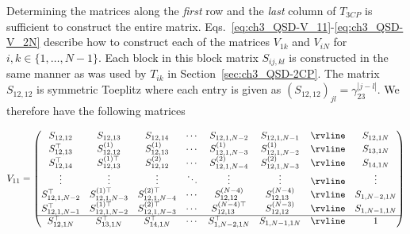 \begin{appendices}
Determining the matrices along the \emph{first} row and the \emph{last} column of $T_{3CP}$ is sufficient to construct the entire matrix.
Eqs.~\eqref{eq:ch3_QSD-V_11}-\eqref{eq:ch3_QSD-V_2N} describe how to construct each of the matrices $V_{1k}$ and $V_{iN}$ for $i, k \in \{1, \dots, N-1\}$.
Each block in this block matrix $S_{ij,kl}$ is constructed in the same manner as was used by $T_{ik}$ in Section~\ref{sec:ch3_QSD-2CP}.
The matrix $S_{12,12}$ is symmetric Toeplitz where each entry is given as $(S_{12,12})_{jl} = \gamma_{23}^{|j-l|}$.
We therefore have the following matrices

\begin{align}
    \label{eq:ch3_QSD-V_11}
    V_{11} =
    \begin{pmatrix}
        S_{12,12} & S_{12,13} & S_{12,14} & \cdots & S_{12,1,N-2} & S_{12,1,N-1} & \rvline & S_{12,1N} \\
        S_{12,13}^\top & S_{12,12}^{(1)} & S_{12,13}^{(1)} & \cdots & S_{12,1,N-3}^{(1)} & S_{12,1,N-2}^{(1)} & \rvline & S_{13,1N} \\
        S_{12,14}^\top & S_{12,13}^{(1)\top} & S_{12,12}^{(2)} & \cdots & S_{12,1,N-4}^{(2)} & S_{12,1,N-3}^{(2)} & \rvline & S_{14,1N} \\
        \vdots & \vdots & \vdots & \ddots & \vdots & \vdots & \rvline & \vdots \\
        S_{12,1,N-2}^\top & S_{12,1,N-3}^{(1)\top} & S_{12,1,N-4}^{(2)\top} & \cdots & S_{12,12}^{(N-4)} & S_{12,13}^{(N-4)} & \rvline & S_{1,N-2,1N} \\
        S_{12,1,N-1}^\top & S_{12,1,N-2}^{(1)\top} & S_{12,1,N-3}^{(2)\top} & \cdots & S_{12,13}^{(N-4)\top} & S_{12,12}^{(N-3)} & \rvline & S_{1,N-1,1N} \\
        \hline
        S_{12,1N}^\top & S_{13,1N}^\top & S_{14,1N}^\top & \cdots & S_{1,N-2,1N}^\top & S_{1,N-1,1N} & \rvline & 1 \\
    \end{pmatrix}
\end{align}


\end{appendices}
